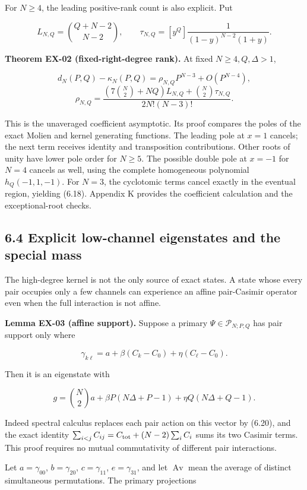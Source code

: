 \documentclass[a4paper,11pt]{article}
\numberwithin{equation}{section}
\begin{document}
For \(N\ge4\), the leading positive-rank count is also explicit. Put

\[
L_{N,Q}=\binom{Q+N-2}{N-2},\qquad
\tau_{N,Q}=[y^Q]\frac1{(1-y)^{N-2}(1+y)}.
\]

\textbf{Theorem EX-02 (fixed-right-degree rank).} At fixed \(N\ge4,Q,\Delta>1\),

\[
d_N(P,Q)-\kappa_N(P,Q)
=\rho_{N,Q}P^{N-3}+O(P^{N-4}),
\] \[
\rho_{N,Q}=
\frac{(7\binom N2+NQ)L_{N,Q}+\binom N2\tau_{N,Q}}
{2N!(N-3)!}.
\tag{6.19}
\]

This is the unaveraged coefficient asymptotic. Its proof compares the poles of the exact Molien and kernel generating functions. The leading pole at \(x=1\) cancels; the next term receives identity and transposition contributions. Other roots of unity have lower pole order for \(N\ge5\). The possible double pole at \(x=-1\) for \(N=4\) cancels as well, using the complete homogeneous polynomial \(h_Q(-1,1,-1)\). For \(N=3\), the cyclotomic terms cancel exactly in the eventual region, yielding (6.18). Appendix K provides the coefficient calculation and the exceptional-root checks.

\hypertarget{explicit-low-channel-eigenstates-and-the-special-mass}{%
\subsection{6.4 Explicit low-channel eigenstates and the special mass}\label{explicit-low-channel-eigenstates-and-the-special-mass}}

The high-degree kernel is not the only source of exact states. A state whose every pair occupies only a few channels can experience an affine pair-Casimir operator even when the full interaction is not affine.

\textbf{Lemma EX-03 (affine support).} Suppose a primary \(\Psi\in\mathcal P_{N;P,Q}\) has pair support only where

\[
\gamma_{k\ell}=a+\beta(C_k-C_0)+\eta(C_\ell-C_0).
\tag{6.20}
\]

Then it is an eigenstate with

\[
g=\binom N2a+\beta P(N\Delta+P-1)+\eta Q(N\Delta+Q-1).
\tag{6.21}
\]

Indeed spectral calculus replaces each pair action on this vector by (6.20), and the exact identity \(\sum_{i<j}C_{ij}=C_{\rm tot}+(N-2)\sum_iC_i\) sums its two Casimir terms. This proof requires no mutual commutativity of different pair interactions.

Let \(a=\gamma_{00}\), \(b=\gamma_{20}\), \(c=\gamma_{11}\), \(e=\gamma_{31}\), and let \(\operatorname{Av}\) mean the average of distinct simultaneous permutations. The primary projections
\end{document}
